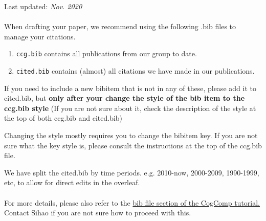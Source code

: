 \documentclass[11pt,a4paper]{article}
\begin{document}
Last updated: \textit{Nov. 2020}\\\\
When drafting your paper, we recommend using the following .bib files to manage your citations. \cite{DCLT19} 
\begin{enumerate}
    \item \texttt{ccg.bib} contains all publications from our group to date.
    \item \texttt{cited.bib} contains (almost) all citations we have made in our publications. 
\end{enumerate}

If you need to include a new bibitem that is not in any of these, please add it to cited.bib, but {\bf only after your change the style of the bib item to the ccg.bib style}
(If you are not sure about it, check the description of the style at the top of both ccg.bib and cited.bib)

Changing the style mostly requires you to change the bibitem key. If you are not sure what the key style is, please consult the instructions at the top of the ccg.bib file.

We have split the cited.bib by time periods. e.g. 2010-now, 2000-2009, 1990-1999, etc, to allow for direct edits in the overleaf. \\\\
For more details, please also refer to the \href{ https://docs.google.com/document/d/1I33aIJXMzIIaZQDHZzdpDEink5fKztU_VKFlbj-KzhA/edit#heading=h.k9gb5efodg4w}{\color{blue} bib file section of the CogComp tutorial. } \\

Contact Sihao if you are not sure how to proceed with this. 



\end{document}
